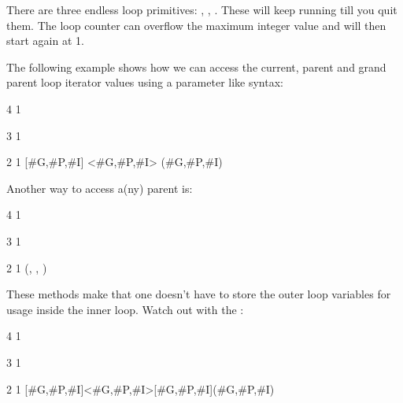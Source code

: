 \stopsectionlevel

\startsectionlevel[title=Endless loops]

There are three endless loop primitives: \typ {\localcontrolledendless}, \typ
{\expandedendless}, \typ {\unexpandedendless}. These will keep running till you
quit them. The loop counter can overflow the maximum integer value and will then
start again at 1.

\stopsectionlevel


\startsectionlevel[title=Loop variables]

The following example shows how we can access the current, parent and grand parent
loop iterator values using a parameter like syntax:

\startbuffer
{} 4 1 {%
     3 1 {%
         2 1 {%
  \edef\foo{[#G,#P,#I]}\foo
  \def \oof{<#G,#P,#I>}\oof
            (#G,#P,#I)\space
        }
        \par
    }
}
\stopbuffer

\typebuffer  \startpacked\getbuffer\stoppacked

Another way to access a(ny) parent is:

\starttyping
{} 4 1 {%
     3 1 {%
         2 1 {%
            (\the{},%
             \the{},%
             \the\currentloopiterator)
        }
        \par
    }
}
\stoptyping

These methods make that one doesn't have to store the outer loop variables for
usage inside the inner loop. Watch out with the \type {\edef}:

\startbuffer
\edef\foo{[#G,#P,#I]}
\def \oof{<#G,#P,#I>}

 4 1 {%
     3 1 {%
         2 1 {%
            \edef\ofo{[#G,#P,#I]}%
            \foo\oof\ofo(#G,#P,#I)\space
        }
        \par
    }
}
\stopbuffer

\typebuffer \startpacked\getbuffer\stoppacked

\stopsectionlevel

\stopdocument

%
%
